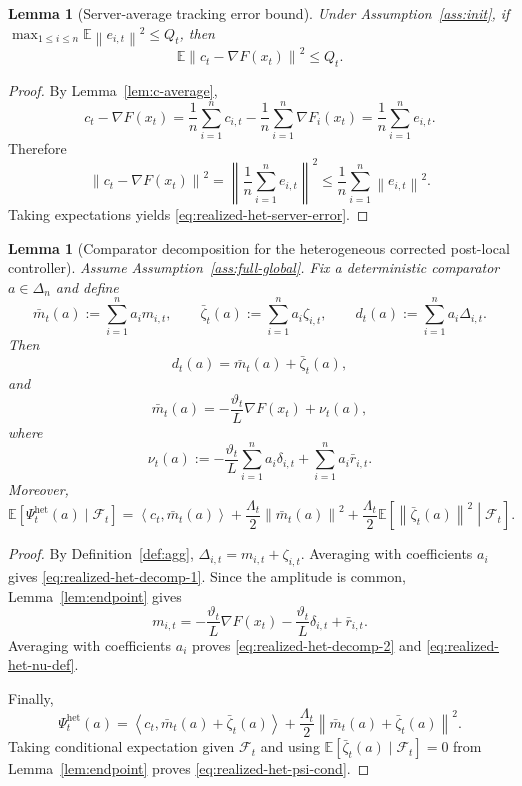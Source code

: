 \documentclass{article}
\newtheorem{lemma}[theorem]{Lemma}
\theoremstyle{definition}
\newcommand{\EE}{\mathbb E}
\newcommand{\norm}[1]{\left\lVert #1\right\rVert}
\newcommand{\ip}[2]{\left\langle #1,#2\right\rangle}
\begin{document}
\begin{lemma}[Server-average tracking error bound]
\label{lem:realized-het-server-error}
Under Assumption~\ref{ass:init}, if $\max_{1\le i\le n}\EE\norm{e_{i,t}}^2\le Q_t$,
then
\begin{equation}
\EE\norm{c_t-\nabla F(x_t)}^2\le Q_t.
\label{eq:realized-het-server-error}\end{equation}
\end{lemma}

\begin{proof}
By Lemma~\ref{lem:c-average},
\[
c_t-\nabla F(x_t)
=
\frac1n\sum_{i=1}^n c_{i,t}-\frac1n\sum_{i=1}^n \nabla F_i(x_t)
=
\frac1n\sum_{i=1}^n e_{i,t}.
\]
Therefore
\[
\norm{c_t-\nabla F(x_t)}^2
=
\left\|
\frac1n\sum_{i=1}^n e_{i,t}
\right\|^2
\le
\frac1n\sum_{i=1}^n \norm{e_{i,t}}^2.
\]
Taking expectations yields \eqref{eq:realized-het-server-error}.
\end{proof}

\begin{lemma}[Comparator decomposition for the heterogeneous corrected post-local controller]
\label{lem:realized-het-decomp}
Assume Assumption~\ref{ass:full-global}. Fix a deterministic comparator $a\in\Delta_n$ and define
\[
\bar m_t(a):=\sum_{i=1}^n a_i m_{i,t},
\qquad
\bar\zeta_t(a):=\sum_{i=1}^n a_i \zeta_{i,t},
\qquad
d_t(a):=\sum_{i=1}^n a_i \Delta_{i,t}.
\]
Then
\begin{equation}
d_t(a)=\bar m_t(a)+\bar\zeta_t(a),
\label{eq:realized-het-decomp-1}\end{equation}
and
\begin{equation}
\bar m_t(a)
=
-\frac{\vartheta_t}{L}\nabla F(x_t)+\nu_t(a),
\label{eq:realized-het-decomp-2}\end{equation}
where
\begin{equation}
\nu_t(a)
:=
-\frac{\vartheta_t}{L}\sum_{i=1}^n a_i \delta_{i,t}
+
\sum_{i=1}^n a_i \bar r_{i,t}.
\label{eq:realized-het-nu-def}\end{equation}
Moreover,
\begin{equation}
\EE[\Psi_t^{\mathrm{het}}(a)\mid \mathcal F_t]
=
\ip{c_t}{\bar m_t(a)}
+
\frac{\Lambda_t}{2}\norm{\bar m_t(a)}^2
+
\frac{\Lambda_t}{2}\EE\!\left[\norm{\bar\zeta_t(a)}^2\middle|\mathcal F_t\right].
\label{eq:realized-het-psi-cond}\end{equation}
\end{lemma}

\begin{proof}
By Definition~\ref{def:agg}, $\Delta_{i,t}=m_{i,t}+\zeta_{i,t}$.
Averaging with coefficients $a_i$ gives \eqref{eq:realized-het-decomp-1}. Since the amplitude is common,
Lemma~\ref{lem:endpoint} gives
\[
m_{i,t}
=
-\frac{\vartheta_t}{L}\nabla F(x_t)
-
\frac{\vartheta_t}{L}\delta_{i,t}
+
\bar r_{i,t}.
\]
Averaging with coefficients $a_i$ proves \eqref{eq:realized-het-decomp-2} and
\eqref{eq:realized-het-nu-def}.

Finally,
\[
\Psi_t^{\mathrm{het}}(a)
=
\ip{c_t}{\bar m_t(a)+\bar\zeta_t(a)}
+
\frac{\Lambda_t}{2}\norm{\bar m_t(a)+\bar\zeta_t(a)}^2.
\]
Taking conditional expectation given $\mathcal F_t$ and using $\EE[\bar\zeta_t(a)\mid \mathcal F_t]=0$
from Lemma~\ref{lem:endpoint} proves \eqref{eq:realized-het-psi-cond}.
\end{proof}
\end{document}
